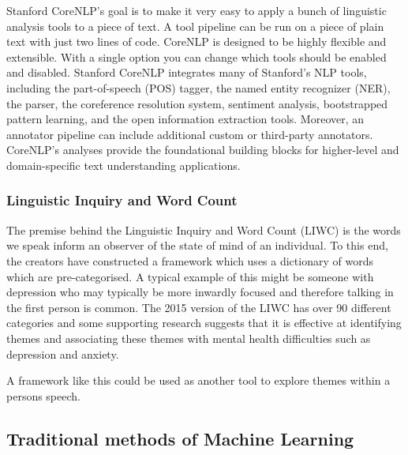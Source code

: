\documentclass[10pt, letterpaper, twoside, openany]{book}
\begin{document}
Stanford CoreNLP’s goal is to make it very easy to apply a bunch of linguistic analysis tools to a piece of text. A tool pipeline can be run on a piece of plain text with just two lines of code. CoreNLP is designed to be highly flexible and extensible. With a single option you can change which tools should be enabled and disabled. Stanford CoreNLP integrates many of Stanford’s NLP tools, including the part-of-speech (POS) tagger, the named entity recognizer (NER), the parser, the coreference resolution system, sentiment analysis, bootstrapped pattern learning, and the open information extraction tools. Moreover, an annotator pipeline can include additional custom or third-party annotators. CoreNLP’s analyses provide the foundational building blocks for higher-level and domain-specific text understanding applications.


\subsubsection{Linguistic Inquiry and Word Count}
The premise behind the Linguistic Inquiry and Word Count (LIWC) is the words we speak inform an observer of the state of mind of an individual. To this end, the creators have constructed a framework which uses a dictionary of words which are pre-categorised. 
A typical example of this might be someone with depression who may typically be more inwardly focused and therefore talking in the first person is common. 
The 2015 version of the LIWC has over 90 different categories and some supporting research suggests that it is effective at identifying themes and associating these themes with mental health difficulties such as depression and anxiety. 
\par
A framework like this could be used as another tool to explore themes within a persons speech.


\subsection{Traditional methods of Machine Learning}
\end{document}
